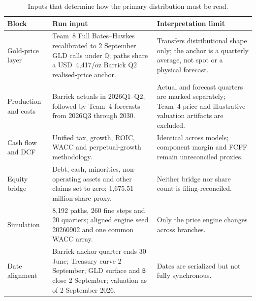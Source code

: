 \begin{table}[H]
\centering
\caption{Inputs that determine how the primary distribution must be read.}
\label{tab:conditional-multimodel-assumptions}
\scriptsize
\renewcommand{\arraystretch}{1.10}
\begin{tabularx}{\textwidth}{@{}p{2.65cm}X X@{}}
\toprule
\textbf{Block} & \textbf{Run input} & \textbf{Interpretation limit} \\
\midrule
Gold-price layer & Team~8 Full Bates--Hawkes recalibrated to 2 September GLD
calls under $\mathbb Q$; paths share a USD~4,417/oz Barrick Q2 realised-price
anchor. & Transfers distributional shape only; the anchor is a quarterly
average, not spot or a physical forecast. \\
Production and costs & Barrick actuals in 2026Q1--Q2, followed by Team~4
forecasts from 2026Q3 through 2030. & Actual and forecast quarters are marked
separately; Team~4 price and illustrative valuation artifacts are excluded. \\
Cash flow and DCF & Unified tax, growth, ROIC, WACC and perpetual-growth
methodology. & Identical across models; component margin and FCFF remain
unreconciled proxies. \\
Equity bridge & Debt, cash, minorities, non-operating assets and other claims
set to zero; 1,675.51 million-share proxy. & Neither bridge nor share count is
filing-reconciled. \\
Simulation & 8,192 paths, 260 fine steps and 20 quarters; aligned engine seed
20260902 and one common WACC array. & Only the price engine changes across
branches. \\
Date alignment & Barrick anchor quarter ends 30 June; Treasury curve 2 September;
GLD surface and \texttt{B} close 2 September; valuation as of 2 September 2026.
& Dates are serialized but not fully synchronous. \\
\bottomrule
\end{tabularx}
\end{table}
